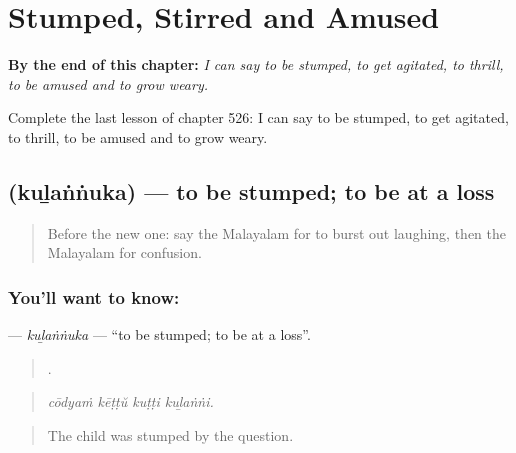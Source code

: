 
\chapter{Stumped, Stirred and Amused}
\label{ch:ml-stumped-stirred-and-amused}

\begin{chapteropening}
\textbf{By the end of this chapter:} \emph{I can say to be stumped, to get agitated, to thrill, to be amused and to grow weary.}

Complete the last lesson of chapter 526: I can say to be stumped, to get agitated, to thrill, to be amused and to grow weary.
\end{chapteropening}

\section[\texorpdfstring{\ml{കുഴങ്ങുക} (kuḻaṅṅuka)}{കുഴങ്ങുക (kuḻaṅṅuka)}]{ (kuḻaṅṅuka) — to be stumped; to be at a loss}

\label{lesson:ML-C526-kulannuka}



\begin{quote}
Before the new one: say the Malayalam for to burst out laughing, then the Malayalam for confusion.
\end{quote}

\subsection*{You'll want to know: }
\textbf{} — \emph{kuḻaṅṅuka} — \textquotedblleft{}to be stumped; to be at a loss\textquotedblright{}.

\begin{quote}
   .
\end{quote}

\begin{quote}
\emph{cōdyaṁ kēṭṭŭ kuṭṭi kuḻaṅṅi.}
\end{quote}

\begin{quote}
The child was stumped by the question.
\end{quote}

